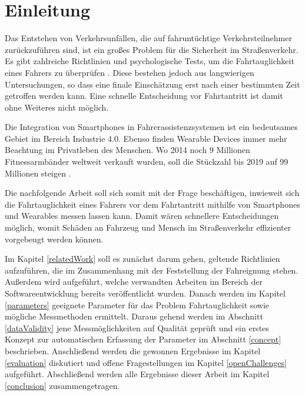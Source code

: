 \section{Einleitung}
\label{introduction}

Das Entstehen von Verkehrsunfällen, die auf fahruntüchtige Verkehrsteilnehmer zurückzuführen sind, ist ein großes Problem für die Sicherheit im Straßenverkehr. Es gibt zahlreiche Richtlinien und psychologische Tests, um die Fahrtauglichkeit eines Fahrers zu überprüfen \cite{drivervehiclelicencingagency,testverfahrenpsychometrischefahreignung,begutachtungsrichtlinien,beurteilungskriterien}. Diese bestehen jedoch aus langwierigen Untersuchungen, so dass eine finale Einschätzung erst nach einer bestimmten Zeit getroffen werden kann.  Eine schnelle Entscheidung vor Fahrtantritt ist damit ohne Weiteres nicht möglich.

Die Integration von Smartphones in Fahrerassistenzsystemen ist ein bedeutsames Gebiet im Bereich Industrie 4.0. Ebenso finden Wearable Devices immer mehr Beachtung im Privatleben des Menschen. Wo 2014 noch 9 Millionen Fitnessarmbänder weltweit verkauft wurden, soll die Stückzahl bis 2019 auf 99 Millionen steigen \cite{wearabletracking}. 

Die nachfolgende Arbeit soll sich somit mit der Frage beschäftigen, inwieweit sich die Fahrtauglichkeit eines Fahrers vor dem Fahrtantritt mithilfe von Smartphones und Wearables messen lassen kann. Damit wären schnellere Entscheidungen möglich, womit Schäden an Fahrzeug und Mensch im Straßenverkehr effizienter vorgebeugt werden können. 

Im Kapitel \ref{relatedWork} soll es zunächst darum gehen, geltende Richtlinien aufzuführen, die im Zusammenhang mit der Feststellung der Fahreignung stehen. Außerdem wird aufgeführt, welche verwandten Arbeiten im Bereich der Softwareentwicklung bereits veröffentlicht wurden. Danach werden im Kapitel \ref{parameters} geeignete Parameter für das Problem Fahrtauglichkeit sowie mögliche Messmethoden ermittelt. Daraus gehend werden im Abschnitt \ref{dataValidity} jene Messmöglichkeiten auf Qualität geprüft und ein erstes Konzept zur automatischen Erfassung der Parameter im Abschnitt \ref{concept} beschrieben. Anschließend werden die gewonnen Ergebnisse im Kapitel \ref{evaluation} diskutiert und offene Fragestellungen im Kapitel \ref{openChallenges} aufgeführt. Abschließend werden alle Ergebnisse dieser Arbeit im Kapitel \ref{conclusion} zusammengetragen.